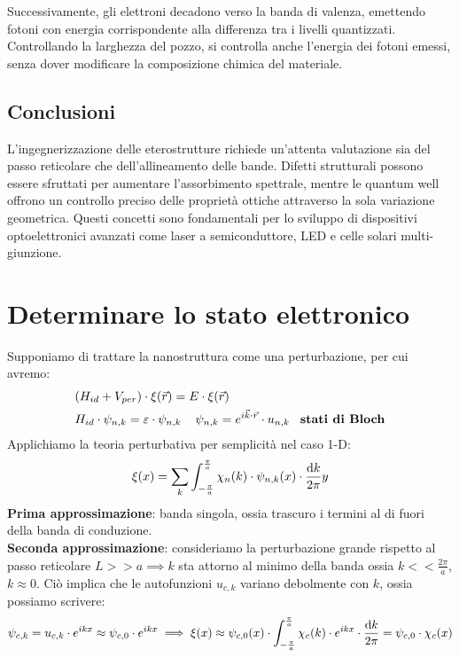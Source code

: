 Successivamente, gli elettroni decadono verso la banda di valenza, emettendo fotoni con energia corrispondente alla differenza tra i livelli quantizzati. Controllando la larghezza del pozzo, si controlla anche l’energia dei fotoni emessi, senza dover modificare la composizione chimica del materiale.

\subsection{Conclusioni}

L’ingegnerizzazione delle eterostrutture richiede un’attenta valutazione sia del passo reticolare che dell’allineamento delle bande. Difetti strutturali possono essere sfruttati per aumentare l’assorbimento spettrale, mentre le quantum well offrono un controllo preciso delle proprietà ottiche attraverso la sola variazione geometrica. Questi concetti sono fondamentali per lo sviluppo di dispositivi optoelettronici avanzati come laser a semiconduttore, LED e celle solari multi-giunzione.


\section{Determinare lo stato elettronico}
Supponiamo di trattare la nanostruttura come una perturbazione, per cui avremo:
\begin{equation}
    \begin{split}
        &(H_{id} + V_{per}) \cdot \xi(\vec{r}) = E \cdot \xi(\vec{r})\\
        &H_{id} \cdot \psi_{n,k}= \varepsilon\cdot \psi_{n,k} \hspace{0.4cm}\psi_{n,k}= e^{i\vec{k}\cdot\vec{r}}\cdot u_{n,k}\hspace{0.3cm} \textbf{stati di Bloch} \\
    \end{split}
\end{equation}
Applichiamo la teoria perturbativa per semplicità nel caso 1-D:
\begin{equation}
    \xi(x) = \sum_k \int_{-\frac{\pi}{a}}^{\frac{\pi}{a}} \chi_n(k)\cdot \psi_{n,k}(x)\cdot \frac{\text{d}{k}}{2\pi}y
\end{equation}
\textbf{Prima approssimazione}: banda singola, ossia trascuro i termini al di fuori della banda di conduzione.\\
\textbf{Seconda approssimazione}: consideriamo la perturbazione grande rispetto al passo reticolare $L>>a \implies k$ sta attorno al minimo della banda ossia $k<<\frac{2\pi}{a}$, $k\approx 0$. Ciò implica che le autofunzioni $u_{c,k}$ variano debolmente con $k$, ossia possiamo scrivere:\\
\[\psi_{c,k} = u_{c,k}\cdot e^{ikx} \approx \psi_{c,0} \cdot e^{ikx} \implies \xi(x) \approx \psi_{c,0}(x) \cdot \int_{-\frac{\pi}{a}}^{\frac{\pi}{a}}\chi_c(k) \cdot e^{ikx}\cdot \frac{\text{d}{k}}{2\pi} = \psi_{c,0}\cdot \chi_c(x)\]
        
